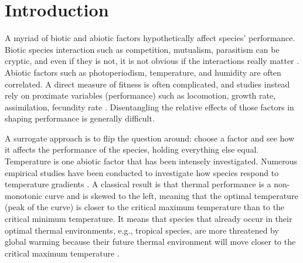 \section*{Introduction}
A myriad of biotic and abiotic factors  hypothetically affect species' performance.
Biotic species interaction such as competition, mutualism, parasitism can be cryptic, and even if they is not, it is not obvious if the interactions really matter \citep{Morales2015}. 
Abiotic factors such as photoperiodism, temperature, and humidity are often correlated. 
A direct measure of fitness is often complicated, and studies instead rely on proximate variables (performance) such as locomotion, growth rate, assimilation, fecundity rate \citep[][and references therein]{Angilletta2009}.
Disentangling the relative effects of those factors in shaping performance is generally difficult.

 
A surrogate approach is to flip the question around: choose a factor and see how it affects the performance of the species, holding everything else equal.
Temperature is one abiotic factor that has been intensely investigated.
Numerous empirical studies have been conducted to investigate how species respond to temperature gradients \citep[e.g.,][]{Angilletta2009}.
A classical result is that thermal performance is a non-monotonic curve and is skewed to the left, meaning that the optimal temperature (peak of the curve) is closer to the critical maximum temperature than to the critical minimum temperature. 
It means that species that already occur in their optimal thermal environments, e.g., tropical species,  are more threatened by global warming because their future thermal environment will move closer to the critical maximum temperature \citep{Deutsch2008}. %

